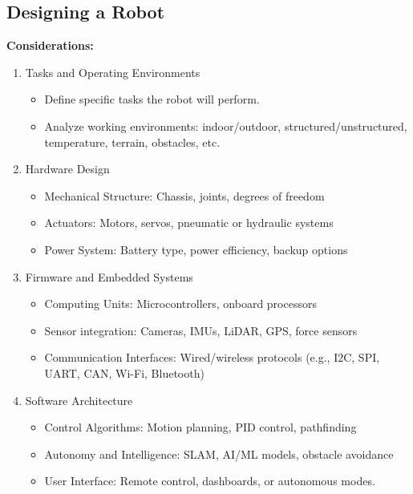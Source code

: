 \documentclass{article}
\begin{document}
\subsection*{Designing a Robot}
\textbf{Considerations:}
\begin{enumerate}
    \item Tasks and Operating Environments
    \begin{itemize}
        \item Define specific tasks the robot will perform.
        \item Analyze working environments: indoor/outdoor, structured/unstructured, temperature, terrain, obstacles, etc.
    \end{itemize}
    \item Hardware Design
    \begin{itemize}
        \item Mechanical Structure: Chassis, joints, degrees of freedom
        \item Actuators: Motors, servos, pneumatic or hydraulic systems
        \item Power System: Battery type, power efficiency, backup options
    \end{itemize}
    \item Firmware and Embedded Systems
    \begin{itemize}
        \item Computing Units: Microcontrollers, onboard processors
        \item Sensor integration: Cameras, IMUs, LiDAR, GPS, force sensors
        \item Communication Interfaces: Wired/wireless protocols (e.g., I2C, SPI, UART, CAN, Wi-Fi, Bluetooth)
    \end{itemize}
    \item Software Architecture
    \begin{itemize}
        \item Control Algorithms: Motion planning, PID control, pathfinding
        \item Autonomy and Intelligence: SLAM, AI/ML models, obstacle avoidance
        \item User Interface: Remote control, dashboards, or autonomous modes.
    \end{itemize}
\end{enumerate}
\end{document}
